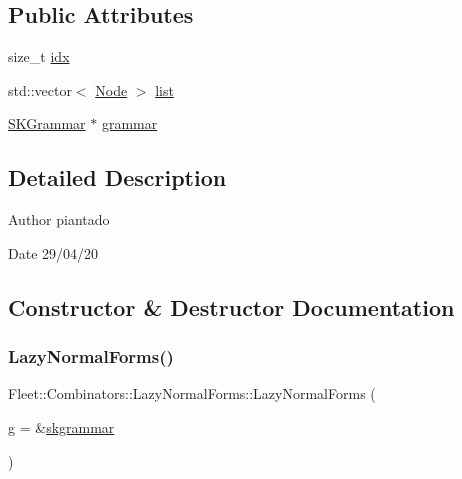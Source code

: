 \subsection*{Public Attributes}
\begin{DoxyCompactItemize}
\item 
size\+\_\+t \hyperlink{class_fleet_1_1_combinators_1_1_lazy_normal_forms_aac1fda9a6b718165e3ea8f4e8a953f48}{idx}
\item 
std\+::vector$<$ \hyperlink{class_node}{Node} $>$ \hyperlink{class_fleet_1_1_combinators_1_1_lazy_normal_forms_a81bc4f4f4739c583fd3aaaaf38c7742d}{list}
\item 
\hyperlink{class_fleet_1_1_combinators_1_1_s_k_grammar}{S\+K\+Grammar} $\ast$ \hyperlink{class_fleet_1_1_combinators_1_1_lazy_normal_forms_a8c03ec76969610b3caad9e309fb05338}{grammar}
\end{DoxyCompactItemize}


\subsection{Detailed Description}
\begin{DoxyAuthor}{Author}
piantado 
\end{DoxyAuthor}
\begin{DoxyDate}{Date}
29/04/20 
\end{DoxyDate}


\subsection{Constructor \& Destructor Documentation}
\mbox{\label{class_fleet_1_1_combinators_1_1_lazy_normal_forms_ab927e6ae4c5e0669c56e91ccc315e12f}} 
\subsubsection{\texorpdfstring{Lazy\+Normal\+Forms()}{LazyNormalForms()}}
{\footnotesize\ttfamily Fleet\+::\+Combinators\+::\+Lazy\+Normal\+Forms\+::\+Lazy\+Normal\+Forms (\begin{DoxyParamCaption}\item[{\hyperlink{class_fleet_1_1_combinators_1_1_s_k_grammar}{S\+K\+Grammar} $\ast$}]{g = {\ttfamily \&\hyperlink{namespace_fleet_1_1_combinators_a5293b7a2dcdbfb430b45fcf401e3bab0}{skgrammar}} }\end{DoxyParamCaption})\hspace{0.3cm}{\ttfamily [inline]}}



